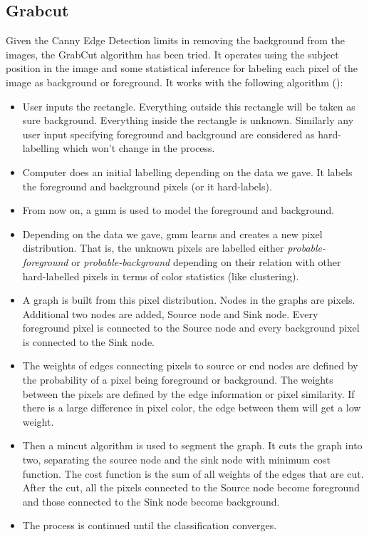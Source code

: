 \subsection{Grabcut}
\label{subsec:masking-grabcut}

Given the Canny Edge Detection limits in removing the background from the images, the GrabCut algorithm has been tried. It operates using the subject position in the image and some statistical inference for labeling each pixel of the image as background or foreground. It works with the following algorithm (\cite{opencv_grabcut}):

\begin{itemize}
	\item User inputs the rectangle. Everything outside this rectangle will be taken as sure background. Everything inside the rectangle is unknown. Similarly any user input specifying foreground and background are considered as hard-labelling which won't change in the process.
	\item Computer does an initial labelling depending on the data we gave. It labels the foreground and background pixels (or it hard-labels).
	\item From now on, a \gls{gmm} is used to model the foreground and background.
	\item Depending on the data we gave, \gls{gmm} learns and creates a new pixel distribution. That is, the unknown pixels are labelled either \textit{probable-foreground} or \textit{probable-background} depending on their relation with other hard-labelled pixels in terms of color statistics (like clustering).
	\item A graph is built from this pixel distribution. Nodes in the graphs are pixels. Additional two nodes are added, Source node and Sink node. Every foreground pixel is connected to the Source node and every background pixel is connected to the Sink node.
	\item The weights of edges connecting pixels to source or end nodes are defined by the probability of a pixel being foreground or background. The weights between the pixels are defined by the edge information or pixel similarity. If there is a large difference in pixel color, the edge between them will get a low weight.
	\item Then a mincut algorithm is used to segment the graph. It cuts the graph into two, separating the source node and the sink node with minimum cost function. The cost function is the sum of all weights of the edges that are cut. After the cut, all the pixels connected to the Source node become foreground and those connected to the Sink node become background.
	\item The process is continued until the classification converges.
\end{itemize}


